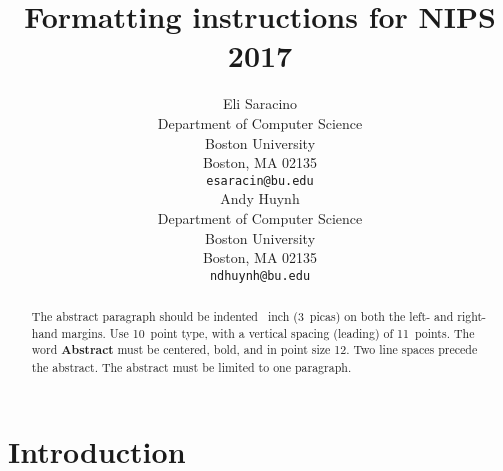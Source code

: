 \documentclass{article}
\title{Formatting instructions for NIPS 2017}
\author{
  Eli Saracino \\
  Department of Computer Science\\
  Boston University\\
  Boston, MA 02135 \\
  \texttt{esaracin@bu.edu} \\
  \And
  Andy Huynh \\
  Department of Computer Science \\
  Boston University \\
  Boston, MA 02135 \\
  \texttt{ndhuynh@bu.edu} \\
}
\begin{document}
\maketitle

\begin{abstract}
  The abstract paragraph should be indented ~inch
  (3~picas) on both the left- and right-hand margins. Use 10~point
  type, with a vertical spacing (leading) of 11~points.  The word
  \textbf{Abstract} must be centered, bold, and in point size 12. Two
  line spaces precede the abstract. The abstract must be limited to
  one paragraph.
\end{abstract}

\section{Introduction}
\end{document}

